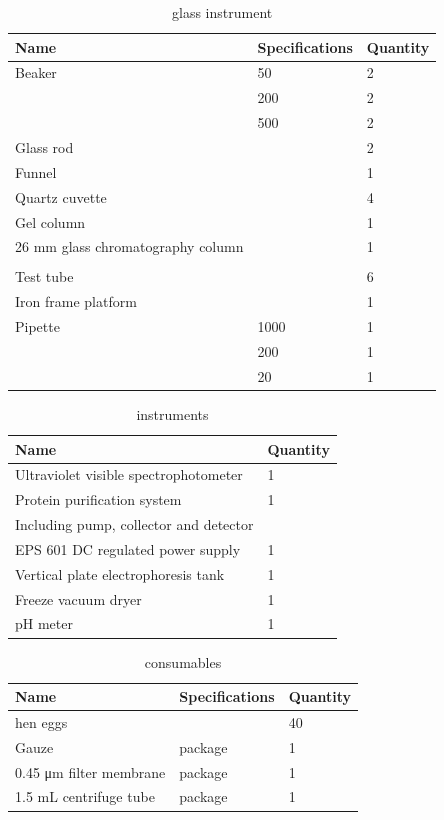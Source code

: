 \begin{table}[!h]
	\centering
	\caption{glass instrument}
    \begin{tabular}{lll}
    \toprule
	Name & Specifications & Quantity \\
	\midrule
	Beaker & 50    & 2 \\
	& 200   & 2 \\
	& 500   & 2 \\
	Glass rod &       & 2 \\
	Funnel &       & 1 \\
	Quartz cuvette &       & 4 \\
	Gel column &       & 1 \\
	26 mm glass chromatography column &       & 1 \\
	&       &  \\
	Test tube &       & 6 \\
	Iron frame platform &       & 1 \\
	Pipette & 1000  & 1 \\
	& 200   & 1 \\
	& 20    & 1 \\
	\bottomrule
	\end{tabular}%
\label{tab:glass}%
\end{table}%

\begin{table}[!h]
  \centering
\caption{instruments}
\begin{tabular}{ll}
	\toprule
	Name & Quantity \\
	\midrule
	Ultraviolet visible spectrophotometer & 1 \\
	Protein purification system & 1 \\
	Including pump, collector and detector &  \\
	EPS 601 DC regulated power supply & 1 \\
	Vertical plate electrophoresis tank & 1 \\
	Freeze vacuum dryer & 1 \\
	pH meter & 1 \\
	\bottomrule
\end{tabular}%
\label{tab:instrument}%
\end{table}%

\begin{table}[!h]
  \centering
\caption{consumables}
\begin{tabular}{lll}
	\toprule
	 Name & Specifications & Quantity \\
	 \midrule
	hen eggs &       & 40 \\
	Gauze & package & 1 \\
	0.45 μm filter membrane & package & 1 \\
	1.5 mL centrifuge tube & package & 1 \\
		\bottomrule
\end{tabular}%
\label{tab:consumables}%
\end{table}%


